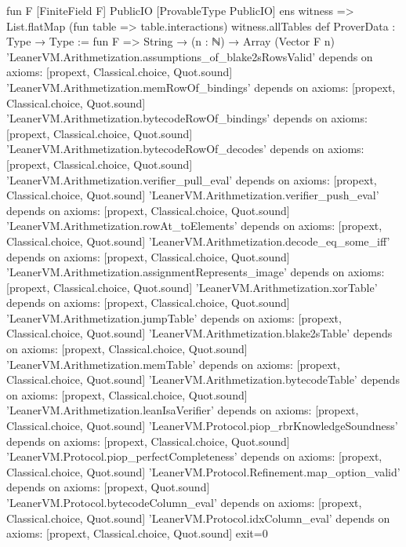 \begin{srccode}[numbers=left,numbersep=3pt]
fun {F} [FiniteField F] {PublicIO} [ProvableType PublicIO] {ens} witness =>
  List.flatMap (fun table => table.interactions) witness.allTables
def ProverData : Type → Type :=
fun F => String → (n : ℕ) → Array (Vector F n)
'LeanerVM.Arithmetization.assumptions_of_blake2sRowsValid' depends on axioms: [propext, Classical.choice, Quot.sound]
'LeanerVM.Arithmetization.memRowOf_bindings' depends on axioms: [propext, Classical.choice, Quot.sound]
'LeanerVM.Arithmetization.bytecodeRowOf_bindings' depends on axioms: [propext, Classical.choice, Quot.sound]
'LeanerVM.Arithmetization.bytecodeRowOf_decodes' depends on axioms: [propext, Classical.choice, Quot.sound]
'LeanerVM.Arithmetization.verifier_pull_eval' depends on axioms: [propext, Classical.choice, Quot.sound]
'LeanerVM.Arithmetization.verifier_push_eval' depends on axioms: [propext, Classical.choice, Quot.sound]
'LeanerVM.Arithmetization.rowAt_toElements' depends on axioms: [propext, Classical.choice, Quot.sound]
'LeanerVM.Arithmetization.decode_eq_some_iff' depends on axioms: [propext, Classical.choice, Quot.sound]
'LeanerVM.Arithmetization.assignmentRepresents_image' depends on axioms: [propext, Classical.choice, Quot.sound]
'LeanerVM.Arithmetization.xorTable' depends on axioms: [propext, Classical.choice, Quot.sound]
'LeanerVM.Arithmetization.jumpTable' depends on axioms: [propext, Classical.choice, Quot.sound]
'LeanerVM.Arithmetization.blake2sTable' depends on axioms: [propext, Classical.choice, Quot.sound]
'LeanerVM.Arithmetization.memTable' depends on axioms: [propext, Classical.choice, Quot.sound]
'LeanerVM.Arithmetization.bytecodeTable' depends on axioms: [propext, Classical.choice, Quot.sound]
'LeanerVM.Arithmetization.leanIsaVerifier' depends on axioms: [propext, Classical.choice, Quot.sound]
'LeanerVM.Protocol.piop_rbrKnowledgeSoundness' depends on axioms: [propext, Classical.choice, Quot.sound]
'LeanerVM.Protocol.piop_perfectCompleteness' depends on axioms: [propext, Classical.choice, Quot.sound]
'LeanerVM.Protocol.Refinement.map_option_valid' depends on axioms: [propext, Quot.sound]
'LeanerVM.Protocol.bytecodeColumn_eval' depends on axioms: [propext, Classical.choice, Quot.sound]
'LeanerVM.Protocol.idxColumn_eval' depends on axioms: [propext, Classical.choice, Quot.sound]
exit=0
\end{srccode}

\subsection{\texorpdfstring{\protect{}}{KnownColumn}}\label{sec:gen-boundary-probe-knowncolumn}

